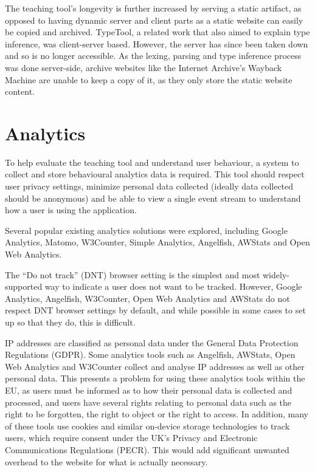 \documentclass[a4paper,fleqn,oneside,12pt]{report}
\begin{document}
The teaching tool’s longevity is further increased by serving a static artifact, as opposed to having dynamic server and client parts as a static website can easily be copied and archived. TypeTool, a related work that also aimed to explain type inference, was client-server based. However, the server has since been taken down and so is no longer accessible. As the lexing, parsing and type inference process was done server-side, archive websites like the Internet Archive’s Wayback Machine are unable to keep a copy of it, as they only store the static website content.

\section{Analytics}\label{id:h.60njhv340fb0}

To help evaluate the teaching tool and understand user behaviour, a system to collect and store behavioural analytics data is required. This tool should respect user privacy settings, minimize personal data collected (ideally data collected should be anonymous) and be able to view a single event stream to understand how a user is using the application.

Several popular existing analytics solutions were explored, including Google Analytics, Matomo, W3Counter, Simple Analytics, Angelfish, AWStats and Open Web Analytics.

The ``Do not track'' (DNT) browser setting is the simplest and most widely-supported way to indicate a user does not want to be tracked. However, Google Analytics, Angelfish, W3Counter, Open Web Analytics and AWStats do not respect DNT browser settings by default, and while possible in some cases to set up so that they do, this is difficult.

IP addresses are classified as personal data under the General Data Protection Regulations (GDPR). Some analytics tools such as Angelfish, AWStats, Open Web Analytics and W3Counter collect and analyse IP addresses as well as other personal data. This presents a problem for using these analytics tools within the EU, as users must be informed as to how their personal data is collected and processed, and users have several rights relating to personal data such as the right to be forgotten, the right to object or the right to access. In addition, many of these tools use cookies and similar on-device storage technologies to track users, which require consent under the UK’s Privacy and Electronic Communications Regulations (PECR). This would add significant unwanted overhead to the website for what is actually necessary.
\end{document}
